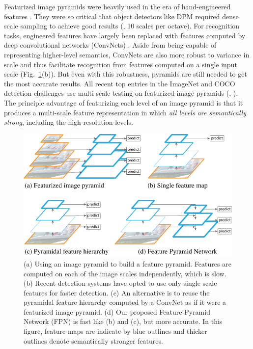 \documentclass[10pt,twocolumn,letterpaper]{article}
\begin{document}
Featurized image pyramids were heavily used in the era of hand-engineered features \cite{Dalal2005,Lowe2004}.
They were so critical that object detectors like DPM \cite{Felzenszwalb2010} required dense scale sampling to achieve good results (\eg, 10 scales per octave).
For recognition tasks, engineered features have largely been replaced with features computed by deep convolutional networks (ConvNets) \cite{Krizhevsky2012,LeCun1989}.
Aside from being capable of representing higher-level semantics, ConvNets are also more robust to variance in scale and thus facilitate recognition from features computed on a single input scale \cite{He2014,Girshick2015a,Ren2015a} (Fig.~\ref{fig:teaser}(b)).
But even with this robustness, pyramids are still needed to get the most accurate results.
All recent top entries in the ImageNet \cite{Russakovsky2015} and COCO \cite{Lin2014} detection challenges use multi-scale testing on featurized image pyramids (\eg, \cite{He2016,Shrivastava2016}).
The principle advantage of featurizing each level of an image pyramid is that it produces a multi-scale feature representation in which \emph{all levels are semantically strong}, including the high-resolution levels.

\begin{figure}[t]
\centering
\includegraphics[width=1.0\linewidth]{ai/teaser}
\caption{(a) Using an image pyramid to build a feature pyramid. Features are computed on each of the image scales independently, which is slow. (b) Recent detection systems have opted to use only single scale features for faster detection. (c) An alternative is to reuse the pyramidal feature hierarchy computed by a ConvNet as if it were a featurized image pyramid. (d) Our proposed Feature Pyramid Network (FPN) is fast like (b) and (c), but more accurate. In this figure, feature maps are indicate by blue outlines and thicker outlines denote semantically stronger features.}
\label{fig:teaser}
\end{figure}
\end{document}
